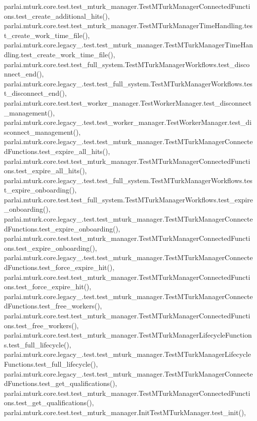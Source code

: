 parlai.\+mturk.\+core.\+test.\+test\+\_\+mturk\+\_\+manager.\+Test\+M\+Turk\+Manager\+Connected\+Functions.\+test\+\_\+create\+\_\+additional\+\_\+hits(), parlai.\+mturk.\+core.\+test.\+test\+\_\+mturk\+\_\+manager.\+Test\+M\+Turk\+Manager\+Time\+Handling.\+test\+\_\+create\+\_\+work\+\_\+time\+\_\+file(), parlai.\+mturk.\+core.\+legacy\+\_.\+test.\+test\+\_\+mturk\+\_\+manager.\+Test\+M\+Turk\+Manager\+Time\+Handling.\+test\+\_\+create\+\_\+work\+\_\+time\+\_\+file(), parlai.\+mturk.\+core.\+test.\+test\+\_\+full\+\_\+system.\+Test\+M\+Turk\+Manager\+Workflows.\+test\+\_\+disconnect\+\_\+end(), parlai.\+mturk.\+core.\+legacy\+\_.\+test.\+test\+\_\+full\+\_\+system.\+Test\+M\+Turk\+Manager\+Workflows.\+test\+\_\+disconnect\+\_\+end(), parlai.\+mturk.\+core.\+test.\+test\+\_\+worker\+\_\+manager.\+Test\+Worker\+Manager.\+test\+\_\+disconnect\+\_\+management(), parlai.\+mturk.\+core.\+legacy\+\_.\+test.\+test\+\_\+worker\+\_\+manager.\+Test\+Worker\+Manager.\+test\+\_\+disconnect\+\_\+management(), parlai.\+mturk.\+core.\+legacy\+\_.\+test.\+test\+\_\+mturk\+\_\+manager.\+Test\+M\+Turk\+Manager\+Connected\+Functions.\+test\+\_\+expire\+\_\+all\+\_\+hits(), parlai.\+mturk.\+core.\+test.\+test\+\_\+mturk\+\_\+manager.\+Test\+M\+Turk\+Manager\+Connected\+Functions.\+test\+\_\+expire\+\_\+all\+\_\+hits(), parlai.\+mturk.\+core.\+legacy\+\_.\+test.\+test\+\_\+full\+\_\+system.\+Test\+M\+Turk\+Manager\+Workflows.\+test\+\_\+expire\+\_\+onboarding(), parlai.\+mturk.\+core.\+test.\+test\+\_\+full\+\_\+system.\+Test\+M\+Turk\+Manager\+Workflows.\+test\+\_\+expire\+\_\+onboarding(), parlai.\+mturk.\+core.\+legacy\+\_.\+test.\+test\+\_\+mturk\+\_\+manager.\+Test\+M\+Turk\+Manager\+Connected\+Functions.\+test\+\_\+expire\+\_\+onboarding(), parlai.\+mturk.\+core.\+test.\+test\+\_\+mturk\+\_\+manager.\+Test\+M\+Turk\+Manager\+Connected\+Functions.\+test\+\_\+expire\+\_\+onboarding(), parlai.\+mturk.\+core.\+legacy\+\_.\+test.\+test\+\_\+mturk\+\_\+manager.\+Test\+M\+Turk\+Manager\+Connected\+Functions.\+test\+\_\+force\+\_\+expire\+\_\+hit(), parlai.\+mturk.\+core.\+test.\+test\+\_\+mturk\+\_\+manager.\+Test\+M\+Turk\+Manager\+Connected\+Functions.\+test\+\_\+force\+\_\+expire\+\_\+hit(), parlai.\+mturk.\+core.\+legacy\+\_.\+test.\+test\+\_\+mturk\+\_\+manager.\+Test\+M\+Turk\+Manager\+Connected\+Functions.\+test\+\_\+free\+\_\+workers(), parlai.\+mturk.\+core.\+test.\+test\+\_\+mturk\+\_\+manager.\+Test\+M\+Turk\+Manager\+Connected\+Functions.\+test\+\_\+free\+\_\+workers(), parlai.\+mturk.\+core.\+test.\+test\+\_\+mturk\+\_\+manager.\+Test\+M\+Turk\+Manager\+Lifecycle\+Functions.\+test\+\_\+full\+\_\+lifecycle(), parlai.\+mturk.\+core.\+legacy\+\_.\+test.\+test\+\_\+mturk\+\_\+manager.\+Test\+M\+Turk\+Manager\+Lifecycle\+Functions.\+test\+\_\+full\+\_\+lifecycle(), parlai.\+mturk.\+core.\+legacy\+\_.\+test.\+test\+\_\+mturk\+\_\+manager.\+Test\+M\+Turk\+Manager\+Connected\+Functions.\+test\+\_\+get\+\_\+qualifications(), parlai.\+mturk.\+core.\+test.\+test\+\_\+mturk\+\_\+manager.\+Test\+M\+Turk\+Manager\+Connected\+Functions.\+test\+\_\+get\+\_\+qualifications(), parlai.\+mturk.\+core.\+test.\+test\+\_\+mturk\+\_\+manager.\+Init\+Test\+M\+Turk\+Manager.\+test\+\_\+init(), 